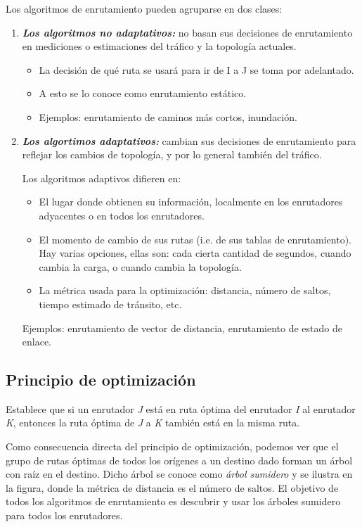 		\par Los algoritmos de enrutamiento pueden agruparse en dos clases: 
		\begin{enumerate}
		
			\item  \textbf{\emph{Los algoritmos no adaptativos: }} no basan sus 
			decisiones de enrutamiento en mediciones o estimaciones del tráfico y la 
			topología actuales.
			\begin{itemize}
				\item La decisión de qué ruta se usará para ir de I a J se toma por 
				adelantado.
				\item A esto se lo conoce como enrutamiento estático.
				\item Ejemplos: enrutamiento de caminos más cortos, inundación.
			\end{itemize}
			
			\item \textbf{\emph{Los algortimos adaptativos:}} cambian sus decisiones de 
			enrutamiento para reflejar los cambios de topología, y por lo general también 
			del tráfico.
			\par Los algoritmos adaptivos difieren en:
			\begin{itemize}
				\item El lugar donde obtienen su información, localmente en los enrutadores 
				adyacentes o en todos los enrutadores.
				\item El momento de cambio de sus rutas (i.e. de sus tablas de 
				enrutamiento). Hay varias opciones, ellas son: cada cierta cantidad de 
				segundos, cuando cambia la carga, o cuando cambia la topología.
				\item La métrica usada para la optimización: distancia, número de saltos, 
				tiempo estimado de tránsito, etc.
			\end{itemize}
			\par Ejemplos: enrutamiento de vector de distancia, enrutamiento de estado de 
			enlace.		
		\end{enumerate}

\subsection{Principio de optimización}
	\par Establece que si un enrutador \textit{J} está en ruta óptima 
	del enrutador \textit{I} al enrutador \textit{K}, entonces la ruta óptima de \textit{J}
	a \textit{K} también está en la misma ruta.
	\par Como consecuencia directa del principio de optimización, podemos ver que el 
	grupo de rutas óptimas de todos los orígenes a un destino dado forman un árbol con 
	raíz en el destino. Dicho árbol se conoce como \textit{árbol sumidero} y se ilustra en 
	la figura, donde la métrica de distancia es el número de saltos. El objetivo de todos 
	los algoritmos de enrutamiento es descubrir y usar los árboles sumidero para todos 
	los enrutadores.
	

